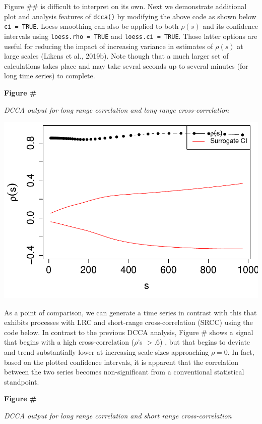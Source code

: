 \documentclass[
  man]{apa6}
\begin{document}
Figure \#\# is difficult to interpret on its own. Next we demonstrate
additional plot and analysis features of \texttt{dcca()} by modifying the above
code as shown below \texttt{ci\ =\ TRUE}. Loess smoothing can also be applied to
both \(\rho(s)\) and its confidence intervals using \texttt{loess.rho\ =\ TRUE} and
\texttt{loess.ci\ =\ TRUE}. Those latter options are useful for reducing the
impact of increasing variance in estimates of \(\rho(s)\) at large scales
(Likens et al., 2019b). Note though that a much larger set of calculations takes
place and may take sevral seconds up to several minutes (for long time
series) to complete.

\textbf{Figure \#}

\emph{DCCA output for long range correlation and long range
cross-correlation}

\includegraphics{fractal_regression_paper_brm_files/figure-latex/unnamed-chunk-17-1.pdf}

As a point of comparison, we can generate a time series in contrast with
this that exhibits processes with LRC and short-range cross-correlation
(SRCC) using the code below. In contrast to the previous DCCA analysis,
Figure \# shows a signal that begins with a high cross-correlation
(\(\rho\)'s \(> .6\)) , but that begins to deviate and trend substantially
lower at increasing scale sizes approaching \(\rho = 0\). In fact, based
on the plotted confidence intervals, it is apparent that the correlation
between the two series becomes non-significant from a conventional
statistical standpoint.

\textbf{Figure \#}

\emph{DCCA output for long range correlation and short range
cross-correlation}
\end{document}
